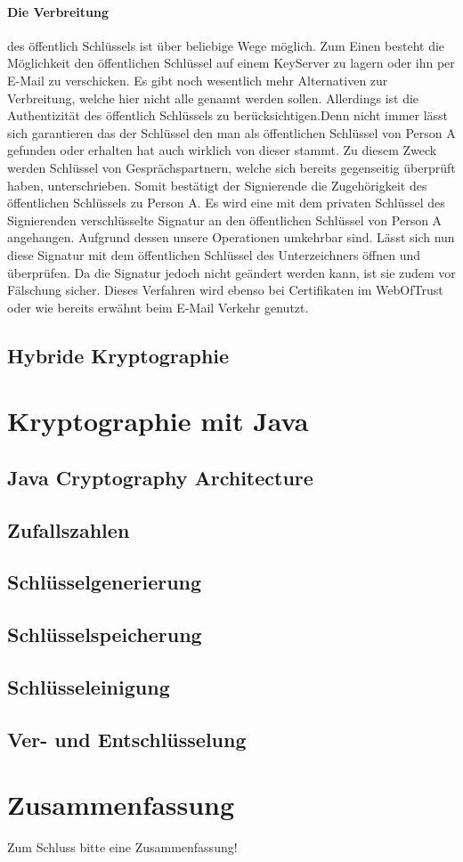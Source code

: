 \documentclass[paper=a4,11pt,german]{scrartcl} %
\begin{document}
\paragraph{Die Verbreitung}
des öffentlich Schlüssels ist über beliebige Wege möglich. Zum Einen besteht die Möglichkeit den öffentlichen Schlüssel auf einem KeyServer zu lagern oder ihn per E-Mail zu verschicken. Es gibt noch wesentlich mehr Alternativen zur Verbreitung, welche hier nicht alle genannt werden sollen. Allerdings ist die Authentizität des öffentlich Schlüssels zu berücksichtigen.Denn nicht immer lässt sich garantieren das der Schlüssel den man als öffentlichen Schlüssel von Person A gefunden oder erhalten hat auch wirklich von dieser stammt. Zu diesem Zweck werden Schlüssel von Gesprächspartnern, welche sich bereits gegenseitig überprüft haben, unterschrieben. Somit bestätigt der Signierende die Zugehörigkeit des öffentlichen Schlüssels zu Person A. Es wird eine mit dem privaten Schlüssel des Signierenden verschlüsselte Signatur an den öffentlichen Schlüssel von Person A angehangen. Aufgrund dessen unsere Operationen umkehrbar sind. Lässt sich nun diese Signatur mit dem öffentlichen Schlüssel des Unterzeichners öffnen und überprüfen. Da die Signatur jedoch nicht geändert werden kann, ist sie zudem vor Fälschung sicher. Dieses Verfahren wird ebenso bei Certifikaten im WebOfTrust oder wie bereits erwähnt beim E-Mail Verkehr genutzt.

\subsection{Hybride Kryptographie}


\section{Kryptographie mit Java}
\subsection{Java Cryptography Architecture}

\subsection{Zufallszahlen}

\subsection{Schlüsselgenerierung}

\subsection{Schlüsselspeicherung}

\subsection{Schlüsseleinigung}

\subsection{Ver- und Entschlüsselung}

\section{Zusammenfassung}
Zum Schluss bitte eine Zusammenfassung!



\end{document}
